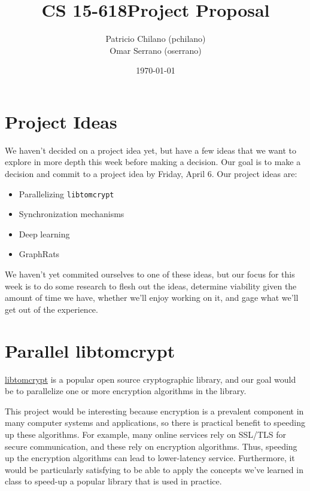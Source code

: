 \documentclass[11pt]{article} %
\title{\vspace{-25pt}
\huge CS 15-618\hfill Project Proposal}
\author{
    Patricio Chilano (pchilano) \\
    Omar Serrano (oserrano)
}
\date{\today}
\begin{document}


\maketitle

\section*{Project Ideas}

We haven't decided on a project idea yet, but have a few ideas that we want to
explore in more depth this week before making a decision. Our goal is to make a
decision and commit to a project idea by Friday, April 6. Our project ideas are:

\begin{itemize}
\item
Parallelizing \texttt{libtomcrypt}
\item
Synchronization mechanisms
\item
Deep learning
\item
GraphRats
\end{itemize}

We haven't yet commited ourselves to one of these ideas, but our focus for this
week is to do some research to flesh out the ideas, determine viability given
the amount of time we have, whether we'll enjoy working on it, and gage what
we'll get out of the experience.

\section*{Parallel libtomcrypt}

\href{https://github.com/libtom/libtomcrypt}{libtomcrypt} is a popular open
source cryptographic library, and our goal would be to parallelize one or more
encryption algorithms in the library.

This project would be interesting because encryption is a prevalent component in
many computer systems and applications, so there is practical benefit to
speeding up these algorithms. For example, many online services rely on SSL/TLS
for secure communication, and these rely on encryption algorithms. Thus,
speeding up the encryption algorithms can lead to lower-latency service.
Furthermore, it would be particularly satisfying to be able to apply the
concepts we've learned in class to speed-up a popular library that is used in
practice.
\end{document}
